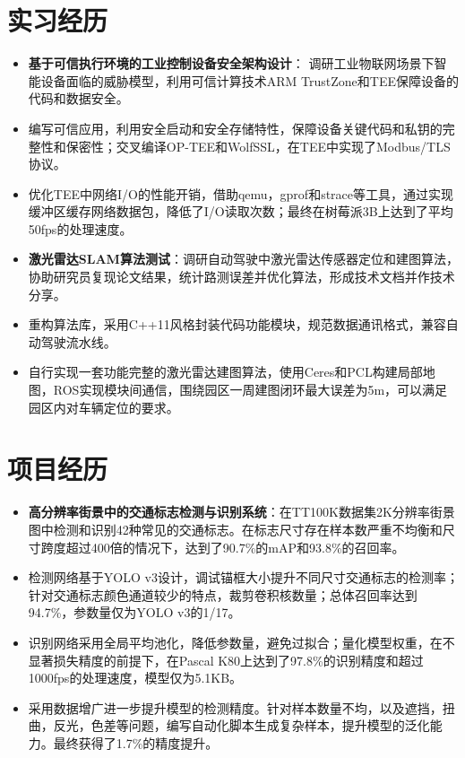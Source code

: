 \documentclass{resume}
\begin{document}
\section{实习经历}
\begin{itemize}
  \item \textbf{基于可信执行环境的工业控制设备安全架构设计}： 调研工业物联网场景下智能设备面临的威胁模型，利用可信计算技术ARM TrustZone和TEE保障设备的代码和数据安全。
  \item 编写可信应用，利用安全启动和安全存储特性，保障设备关键代码和私钥的完整性和保密性；交叉编译OP-TEE和WolfSSL，在TEE中实现了Modbus/TLS协议。
  \item 优化TEE中网络I/O的性能开销，借助qemu，gprof和strace等工具，通过实现缓冲区缓存网络数据包，降低了I/O读取次数；最终在树莓派3B上达到了平均50fps的处理速度。
\end{itemize}

\begin{itemize}
  \item \textbf{激光雷达SLAM算法测试}：调研自动驾驶中激光雷达传感器定位和建图算法，协助研究员复现论文结果，统计路测误差并优化算法，形成技术文档并作技术分享。
  \item 重构算法库，采用C++11风格封装代码功能模块，规范数据通讯格式，兼容自动驾驶流水线。
  \item 自行实现一套功能完整的激光雷达建图算法，使用Ceres和PCL构建局部地图，ROS实现模块间通信，围绕园区一周建图闭环最大误差为5m，可以满足园区内对车辆定位的要求。
\end{itemize}


\section{项目经历}
\begin{itemize}
  \item \textbf{高分辨率街景中的交通标志检测与识别系统}：在TT100K数据集2K分辨率街景图中检测和识别42种常见的交通标志。在标志尺寸存在样本数严重不均衡和尺寸跨度超过400倍的情况下，达到了90.7\%的mAP和93.8\%的召回率。
  \item 检测网络基于YOLO v3设计，调试锚框大小提升不同尺寸交通标志的检测率； 针对交通标志颜色通道较少的特点，裁剪卷积核数量；总体召回率达到94.7\%，参数量仅为YOLO v3的1/17。
  \item 识别网络采用全局平均池化，降低参数量，避免过拟合；量化模型权重，在不显著损失精度的前提下，在Pascal K80上达到了97.8\%的识别精度和超过1000fps的处理速度，模型仅为5.1KB。
  \item 采用数据增广进一步提升模型的检测精度。针对样本数量不均，以及遮挡，扭曲，反光，色差等问题，编写自动化脚本生成复杂样本，提升模型的泛化能力。最终获得了1.7\%的精度提升。
\end{itemize}
\end{document}
